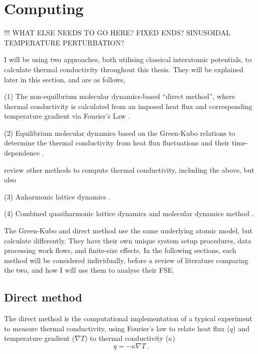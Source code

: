 \pagebreak





\section{Computing \tc}

!!! WHAT ELSE NEEDS TO GO HERE? FIXED ENDS? SINUSOIDAL TEMPERATURE PERTURBATION?

I will be using two approaches, both utilising classical interatomic potentials, to calculate thermal conductivity throughout this thesis. They will be explained later in this section, and are as follows,

(1) The non-equilbrium molecular dynamics-based ``direct method'', where thermal conductivity is calculated from an imposed heat flux and corresponding temperature gradient via Fourier's Law \citep{Muller-Plathe1997,Nieto-Draghi2013}.

(2) Equilibrium molecular dynamics based on the Green-Kubo relations to determine the thermal conductivity from heat flux fluctuations and their time-dependence \citep{Green1954,Kubo1957,Kubo1966,Schelling2002}. 

\citet{Stackhouse2010} review other methods to compute thermal conductivity, including the above, but also

(3) Anharmonic lattice dynamics \citep{Tang2009}. %

(4) Combined quasiharmonic lattice dynamics and molecular dynamics method \citep{DeKoker2009}.

The Green-Kubo and direct method use the same underlying atomic model, but calculate \tcs differently. They have their own unique system setup procedures, data processing work flows, and finite-size effects. In the following sections, each method will be considered individually, before a review of literature comparing the two, and how I will use them to analyse their FSE.



\subsection{Direct method}
The direct method is the computational implementation of a typical experiment to measure thermal conductivity, using Fourier's law to relate heat flux ($q$) and temperature gradient ($\nabla{T}$) to thermal conductivity ($\kappa$)
%
\begin{equation}
q=-\kappa \nabla{T}\ . 
\label{eq:fourier2}
\end{equation}

